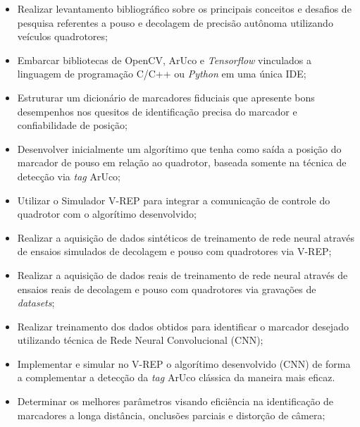 \begin{itemize}
  \item Realizar levantamento bibliográfico sobre os principais conceitos e desafios de pesquisa referentes a pouso e decolagem de precisão autônoma utilizando veículos quadrotores;
  
  \item Embarcar bibliotecas de OpenCV, ArUco e \textit{Tensorflow}  vinculados a linguagem de programação C/C++ ou \textit{Python} em uma única IDE;
  
  \item Estruturar um dicionário de marcadores fiduciais que apresente bons desempenhos nos quesitos de identificação precisa do marcador e confiabilidade de posição;
  
  \item Desenvolver inicialmente um algorítimo que tenha como saída a posição do marcador de pouso em relação ao quadrotor, baseada somente na técnica de detecção via \textit{tag} ArUco;
  
  \item Utilizar o Simulador V-REP para integrar a comunicação de controle do quadrotor com o algorítimo desenvolvido;
  
   \item Realizar a aquisição de dados sintéticos de treinamento de rede neural através de ensaios simulados de decolagem e pouso com quadrotores via V-REP;
  
  \item Realizar a aquisição de dados reais de treinamento de rede neural através de ensaios reais de decolagem e pouso com quadrotores via gravações de \textit{datasets};
   
   \item  Realizar treinamento dos dados obtidos para identificar o marcador desejado utilizando técnica de Rede Neural Convolucional (CNN);
   
   \item Implementar e simular no V-REP o algorítimo desenvolvido (CNN) de forma a complementar a detecção da \textit{tag} ArUco clássica da maneira mais eficaz.
   
   
    \item Determinar os melhores parâmetros visando eficiência na identificação de marcadores a longa distância, onclusões parciais e distorção de câmera;
    
\end{itemize}

